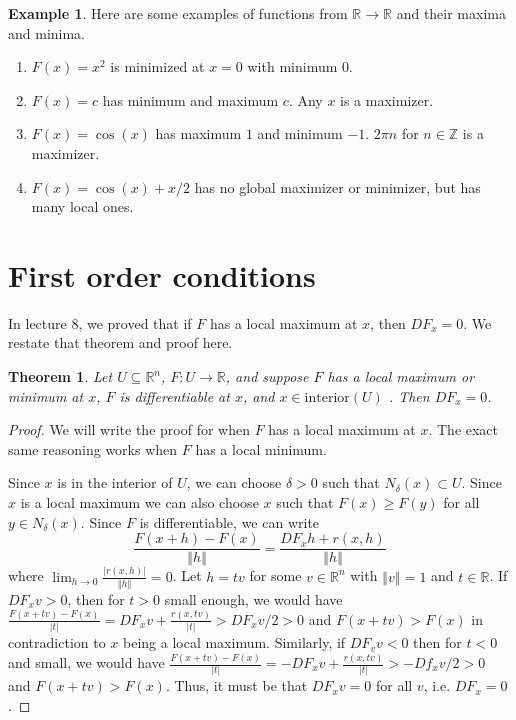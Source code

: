 \documentclass[12pt,reqno]{amsart}
\newtheorem{theorem}{Theorem}[section]
\theoremstyle{definition}
\newtheorem{example}{Example}[section]
\def\R{\mathbb{R}}
\newcommand{\norm}[1]{\left\Vert {#1} \right\Vert}
\renewcommand{\to}{{\rightarrow}}
\begin{document}
\begin{example}
  Here are some examples of functions from $\R \to \R$ and their
  maxima and minima.
  \begin{enumerate}
  \item $F(x) = x^2$ is minimized at $x = 0$ with minimum $0$. 
  \item $F(x) = c$ has minimum and maximum $c$. Any $x$ is a
    maximizer.
  \item $F(x) = \cos(x)$ has maximum $1$ and minimum $-1$. $2\pi n$
    for $n \in \mathbb{Z}$ is a maximizer. 
  \item $F(x) = \cos(x) + x/2$ has no global maximizer or minimizer,
    but has many local ones.
  \end{enumerate}
\end{example}



\section{First order conditions}
In lecture 8, we proved that if $F$ has a local maximum at $x$, then
$DF_x = 0$. We restate that theorem and proof here.
\begin{theorem}
  Let $U \subseteq \R^n$, $F: U \to \R$,  and suppose $F$ has a local
  maximum or minimum at $x$, $F$ is differentiable at $x$, and $x \in
  \mathrm{interior}(U)$ . Then $DF_x = 0$.  
\end{theorem}
\begin{proof}
  We will write the proof for when $F$ has a local maximum at $x$. The
  exact same reasoning works when $F$ has a local minimum. 

  Since $x$ is in the interior of $U$, we can choose $\delta>0$ such
  that $N_\delta(x) \subset U$. Since $x$ is a local maximum we can
  also choose $x$ such that $F(x) \geq F(y)$ for all $y \in
  N_\delta(x)$.  Since $F$ is differentiable, we can write
  \[ \frac{F(x+h) - F(x)}{\norm{h}} =\frac{ DF_x h +
    r(x,h)}{\norm{h}} \] where $\lim_{h \to 0}
  \frac{|r(x,h)|}{\norm{h}} = 0$. Let $h = t v$ for some $v \in \R^n$
  with $\norm{v} =1$ and $t \in \R$. If $D F_x v > 0$, then for $t>0$
  small enough, we would have $\frac{F(x+tv) - F(x)}{|t|} = D
  F_x v + \frac{r(x,tv)}{|t|} > D
  F_x v / 2 > 0$ and $F(x+tv)> F(x)$ in contradiction to $x$ being a
  local maximum. Similarly, if $D F_v v < 0$ then for $t<0$ and small,
  we would have $\frac{F(x+tv) - F(x)}{|t|} = -DF_x v +
  \frac{r(x,tv)}{|t|} > -D f_x v / 2 > 0$ and $F(x+tv)> F(x)$. Thus,
  it must be that $D F_x v = 0$ for all $v$, i.e. $D F_x = 0$.  
\end{proof}
\end{document}
